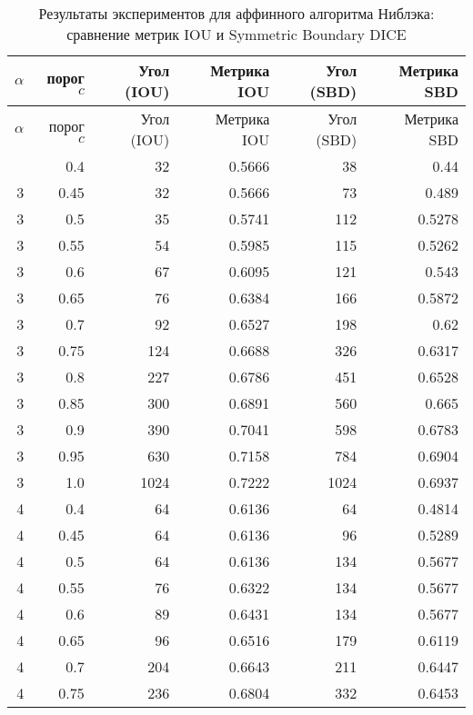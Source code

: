 
\begin{center}
\begin{longtable}{|r|r|r|r|r|r|}
\caption{Результаты экспериментов для аффинного алгоритма Ниблэка: сравнение метрик IOU и Symmetric Boundary DICE} 
\label{tab:affine-niblack} \\
\hline
\(\alpha\) & порог \(c\) & Угол (IOU) & Метрика IOU & Угол (SBD) & Метрика SBD \\
\hline
\endfirsthead

\hline
\(\alpha\) & порог \(c\) & Угол (IOU) & Метрика IOU & Угол (SBD) & Метрика SBD \\
\hline
\endhead

\hline
\endfoot

\hline
\endlastfoot
3 & 0.4 & 32 & 0.5666 & 38 & 0.44 \\
\hline
3 & 0.45 & 32 & 0.5666 & 73 & 0.489 \\
\hline
3 & 0.5 & 35 & 0.5741 & 112 & 0.5278 \\
\hline
3 & 0.55 & 54 & 0.5985 & 115 & 0.5262 \\
\hline
3 & 0.6 & 67 & 0.6095 & 121 & 0.543 \\
\hline
3 & 0.65 & 76 & 0.6384 & 166 & 0.5872 \\
\hline
3 & 0.7 & 92 & 0.6527 & 198 & 0.62 \\
\hline
3 & 0.75 & 124 & 0.6688 & 326 & 0.6317 \\
\hline
3 & 0.8 & 227 & 0.6786 & 451 & 0.6528 \\
\hline
3 & 0.85 & 300 & 0.6891 & 560 & 0.665 \\
\hline
3 & 0.9 & 390 & 0.7041 & 598 & 0.6783 \\
\hline
3 & 0.95 & 630 & 0.7158 & 784 & 0.6904 \\
\hline
3 & 1.0 & 1024 & 0.7222 & 1024 & 0.6937 \\
\hline
4 & 0.4 & 64 & 0.6136 & 64 & 0.4814 \\
\hline
4 & 0.45 & 64 & 0.6136 & 96 & 0.5289 \\
\hline
4 & 0.5 & 64 & 0.6136 & 134 & 0.5677 \\
\hline
4 & 0.55 & 76 & 0.6322 & 134 & 0.5677 \\
\hline
4 & 0.6 & 89 & 0.6431 & 134 & 0.5677 \\
\hline
4 & 0.65 & 96 & 0.6516 & 179 & 0.6119 \\
\hline
4 & 0.7 & 204 & 0.6643 & 211 & 0.6447 \\
\hline
4 & 0.75 & 236 & 0.6804 & 332 & 0.6453 \\
\hline

\end{longtable}
\end{center}
